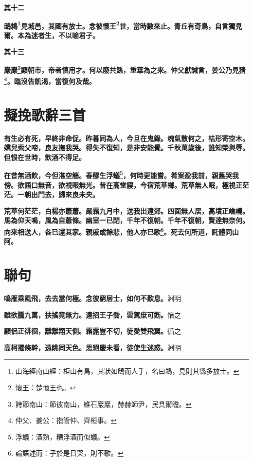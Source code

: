 \begin{quoting}\textbf{其十二}\end{quoting}

\textbf{鴟鴸\footnote{山海經南山經：柜山有鳥，其狀如鴟而人手，名曰鴸，見則其縣多放士。}見城邑，其國有放士。念彼懷王\footnote{懷王：楚懷王也。}世，當時數來止。青丘有奇鳥，自言獨見爾。本為迷者生，不以喻君子。}

\begin{quoting}\textbf{其十三}\end{quoting}

\textbf{巖巖\footnote{詩節南山：節彼南山，維石巖巖，赫赫師尹，民具爾瞻。}顯朝市，帝者慎用才。何以廢共鯀，重華為之來。仲父獻誠言，姜公乃見猜\footnote{仲父、姜公：指管仲、齊桓事。}。臨沒告飢渴，當復何及哉。}

\section{擬挽歌辭三首}

\textbf{有生必有死，早終非命促。昨暮同為人，今旦在鬼錄。魂氣散何之，枯形寄空木。嬌兒索父啼，良友撫我哭。得失不復知，是非安能覺。千秋萬歲後，誰知榮與辱。但恨在世時，飲酒不得足。}

\textbf{在昔無酒飲，今但湛空觴。春醪生浮蟻\footnote{浮蟻：酒熟，糟浮酒而似蟻。}，何時更能嘗。肴案盈我前，親舊哭我傍。欲語口無音，欲視眼無光。昔在高堂寢，今宿荒草鄉。荒草無人眠，極視正茫茫。一朝出門去，歸來良未央。}

\textbf{荒草何茫茫，白楊亦蕭蕭。嚴霜九月中，送我出遠郊。四面無人居，高墳正嶕嶢。馬為仰天鳴，風為自蕭條。幽室一已閉，千年不復朝。千年不復朝，賢達無奈何。向來相送人，各已還其家。親戚或餘悲，他人亦已歌\footnote{論語述而：子於是日哭，則不歌。}。死去何所道，託體同山阿。}

\section{聯句}

\textbf{鳴雁乘風飛，去去當何極。念彼窮居士，如何不歎息。}{\footnotesize 淵明}

\textbf{雖欲騰九萬，扶搖竟無力。遠招王子喬，雲駕庶可飭。}{\footnotesize 愔之}

\textbf{顧侶正徘徊，離離翔天側。霜露豈不切，徒愛雙飛翼。}{\footnotesize 循之}

\textbf{高柯擢條幹，遠眺同天色。思絕慶未看，徒使生迷惑。}{\footnotesize 淵明}